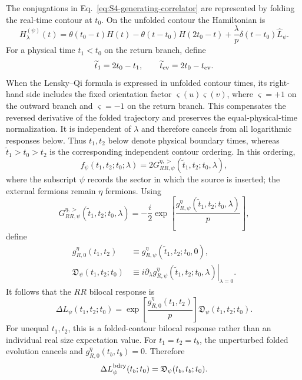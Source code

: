 \documentclass[11pt,a4paper]{article}
\begin{document}
The conjugations in Eq.~\eqref{eq:S4-generating-correlator} are represented
by folding the real-time contour at \(t_0\). On the unfolded contour the
Hamiltonian is
\begin{equation}
  H^{(\psi)}_\lambda(t)
  =
  \theta(t_0-t)H(t)
  -
  \theta(t-t_0)H(2t_0-t)
  +
  \frac{\lambda}{p}
  \delta(t-t_0)\hat L_\psi .
\label{eq:S4-folded-Hamiltonian}
\end{equation}
For a physical time \(t_1<t_0\) on the return branch, define
\begin{equation}
  \widetilde t_1
  =
  2t_0-t_1,
  \qquad
  \widetilde t_{\rm ev}
  =
  2t_0-t_{\rm ev}.
\label{eq:S4-reflected-coordinates}
\end{equation}
When the Lensky--Qi formula is expressed in unfolded contour times, its
right-hand side includes the fixed orientation factor
\(\varsigma(u)\varsigma(v)\), where \(\varsigma=+1\) on the outward
branch and \(\varsigma=-1\) on the return branch. This compensates the
reversed derivative of the folded trajectory and preserves the equal-physical-time
normalization. It is independent of \(\lambda\) and therefore cancels from
all logarithmic responses below.
Thus \(t_1,t_2\) below denote physical boundary times, whereas
\(\widetilde t_1>t_0>t_2\) is the corresponding independent contour
ordering. In this ordering,
\begin{equation}
  f_\psi(t_1,t_2;t_0;\lambda)
  =
  2G^{\eta,>}_{RR,\psi}
  (\widetilde t_1,t_2;t_0,\lambda),
\label{eq:S4-generating-G}
\end{equation}
where the subscript \(\psi\) records the sector in which the source is
inserted; the external fermions remain \(\eta\) fermions. Using
\begin{equation}
  G^{\eta,>}_{RR,\psi}
  (\widetilde t_1,t_2;t_0,\lambda)
  =
  -\frac{i}{2}
  \exp\left[
  \frac{
  g^\eta_{R,\psi}(\widetilde t_1,t_2;t_0,\lambda)
  }{p}
  \right],
\label{eq:S4-source-deformed-large-p}
\end{equation}
define
\begin{equation}
\begin{aligned}
  g^\eta_{R,0}(t_1,t_2)
  &\equiv
  g^\eta_{R,\psi}(\widetilde t_1,t_2;t_0,0),
  \\
  \mathfrak D_\psi(t_1,t_2;t_0)
  &\equiv
  i\left.
  \partial_\lambda
  g^\eta_{R,\psi}(\widetilde t_1,t_2;t_0,\lambda)
  \right|_{\lambda=0}.
\end{aligned}
\label{eq:S4-D-definition}
\end{equation}
It follows that the \(RR\) bilocal response is
\begin{equation}
  \Delta L_\psi(t_1,t_2;t_0)
  =
  \exp\left[
  \frac{g^\eta_{R,0}(t_1,t_2)}{p}
  \right]
  \mathfrak D_\psi(t_1,t_2;t_0).
\label{eq:S4-response-D-relation}
\end{equation}
For unequal \(t_1,t_2\), this is a folded-contour bilocal response rather
than an individual real size expectation value. For \(t_1=t_2=t_b\), the
unperturbed folded evolution cancels and
\(g^\eta_{R,0}(t_b,t_b)=0\). Therefore
\begin{equation}
  \Delta L^{\rm bdry}_\psi(t_b;t_0)
  =
  \mathfrak D_\psi(t_b,t_b;t_0).
\label{eq:S4-physical-size-D}
\end{equation}
\end{document}
